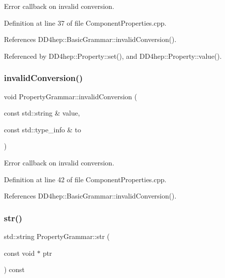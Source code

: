 Error callback on invalid conversion. 



Definition at line 37 of file Component\+Properties.\+cpp.



References D\+D4hep\+::\+Basic\+Grammar\+::invalid\+Conversion().



Referenced by D\+D4hep\+::\+Property\+::set(), and D\+D4hep\+::\+Property\+::value().

\hypertarget{class_d_d4hep_1_1_property_grammar_af0a4553e93979108dd872da16091e206}{}\label{class_d_d4hep_1_1_property_grammar_af0a4553e93979108dd872da16091e206} 
\subsubsection{\texorpdfstring{invalid\+Conversion()}{invalidConversion()}\hspace{0.1cm}{\footnotesize\ttfamily [2/2]}}
{\footnotesize\ttfamily void Property\+Grammar\+::invalid\+Conversion (\begin{DoxyParamCaption}\item[{const std\+::string \&}]{value,  }\item[{const std\+::type\+\_\+info \&}]{to }\end{DoxyParamCaption})\hspace{0.3cm}{\ttfamily [static]}}



Error callback on invalid conversion. 



Definition at line 42 of file Component\+Properties.\+cpp.



References D\+D4hep\+::\+Basic\+Grammar\+::invalid\+Conversion().

\hypertarget{class_d_d4hep_1_1_property_grammar_a5546977c21fc7cb70df7fb510f8951c3}{}\label{class_d_d4hep_1_1_property_grammar_a5546977c21fc7cb70df7fb510f8951c3} 
\subsubsection{\texorpdfstring{str()}{str()}}
{\footnotesize\ttfamily std\+::string Property\+Grammar\+::str (\begin{DoxyParamCaption}\item[{const void $\ast$}]{ptr }\end{DoxyParamCaption}) const\hspace{0.3cm}{\ttfamily [virtual]}}



